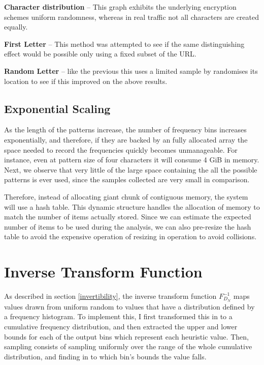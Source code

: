 \documentclass[ %
                    author={Samuel Russell},
                supervisor={Prof. Bogdan Warinschi},
                    degree={MEng},
                     title={Innocuous Ciphertexts},
                  subtitle={The DE-CENSOR Scheme},
                      type={research},
                      year={2018} ]{dissertation}
\begin{document}
\textbf{Character distribution} -- This graph exhibits the underlying encryption schemes uniform randomness, whereas in real traffic not all characters are created equally.

\textbf{First Letter} -- This method was attempted to see if the same distinguishing effect would be possible only using a fixed subset of the URL.

\textbf{Random Letter} -- like the previous this uses a limited sample by randomises its location to see if this improved on the above results.

\subsection{Exponential Scaling}

As the length of the patterns increase, the number of frequency bins increases exponentially, and therefore, if they are backed by an fully allocated array the space needed to record the frequencies quickly becomes unmanageable.
For instance, even at pattern size of four characters it will consume 4 GiB in memory.
Next, we observe that very little of the large space containing the all the possible patterns is ever used, since the samples collected are very small in comparison.

Therefore, instead of allocating giant chunk of contiguous memory, the system will use a hash table.
This dynamic structure handles the allocation of memory to match the number of items actually stored.
Since we can estimate the expected number of items to be used during the analysis, we can also pre-resize the hash table to avoid the expensive operation of resizing in operation to avoid collisions.

\section{Inverse Transform Function}

As described in section \ref{invertibility}, the inverse transform function $F^{-1}_{D_N}$ maps values drawn from uniform random to values that have a distribution defined by a frequency histogram.
To implement this, I first transformed this in to a cumulative frequency distribution, and then extracted the upper and lower bounds for each of the output bins which represent each heuristic value.
Then, sampling consists of sampling uniformly over the range of the whole cumulative distribution, and finding in to which bin's bounds the value falls.
\end{document}

